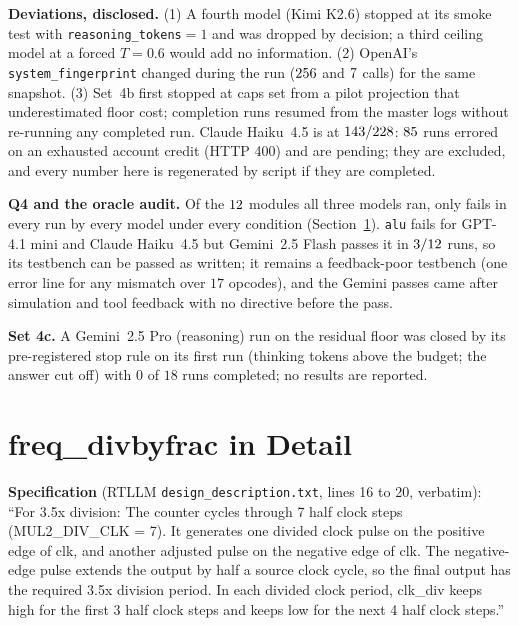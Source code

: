\documentclass[11pt]{article}
\begin{document}
\textbf{Deviations, disclosed.} (1) A fourth model (Kimi K2.6) stopped at its
smoke test with \texttt{reasoning\_tokens}${=}1$ and was dropped by decision; a
third ceiling model at a forced $T{=}0.6$ would add no information. (2)
OpenAI's \texttt{system\_fingerprint} changed during the run
($256$ and $7$ calls) for the same
snapshot. (3) Set~4b first stopped at caps set from a pilot projection that
underestimated floor cost; completion runs resumed from the master logs without
re-running any completed run. Claude Haiku~4.5 is at
$143/228$: $85$ runs errored on
an exhausted account credit (HTTP 400) and are pending; they are excluded, and
every number here is regenerated by script if they are completed.



\textbf{Q4 and the oracle audit.} Of the $12$ modules all
three models ran, only \SetFourBQFour{} fails in every run by every model under
every condition (Section~\ref{s:freq}). \texttt{alu} fails for GPT-4.1 mini and
Claude Haiku~4.5 but Gemini~2.5 Flash passes it in $3/12$ runs, so
its testbench can be passed as written; it remains a feedback-poor testbench (one
error line for any mismatch over $17$ opcodes), and the Gemini passes came after
simulation and tool feedback with no directive before the pass.

\textbf{Set 4c.} A Gemini~2.5 Pro (reasoning) run on the residual floor was
closed by its pre-registered stop rule on its first run (thinking tokens above
the budget; the answer cut off) with $0$ of $18$ runs completed; no results are
reported.

\section{freq\_divbyfrac in Detail}
\label{s:freq}

\textbf{Specification} (RTLLM \texttt{design\_description.txt}, lines 16 to 20,
verbatim): ``For 3.5x division: The counter cycles through 7 half clock steps
(MUL2\_DIV\_CLK = 7). It generates one divided clock pulse on the positive edge
of clk, and another adjusted pulse on the negative edge of clk. The
negative-edge pulse extends the output by half a source clock cycle, so the
final output has the required 3.5x division period. In each divided clock
period, clk\_div keeps high for the first 3 half clock steps and keeps low for
the next 4 half clock steps.''
\end{document}
